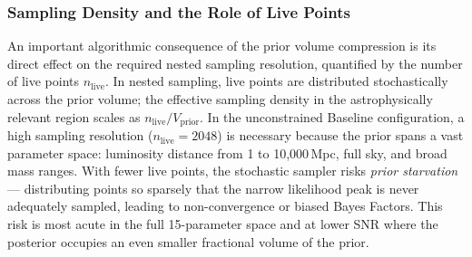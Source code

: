 \documentclass[12pt]{article}
\begin{document}
\subsubsection{Sampling Density and the Role of Live Points}
\label{sec:nlive_justification}
An important algorithmic consequence of the prior volume compression is its direct effect on the required nested sampling resolution, quantified by the number of live points $n_{\text{live}}$. In nested sampling, live points are distributed stochastically across the prior volume; the effective sampling density in the astrophysically relevant region scales as $n_{\text{live}} / V_{\text{prior}}$. In the unconstrained Baseline configuration, a high sampling resolution ($n_{\text{live}} = 2048$) is necessary because the prior spans a vast parameter space: luminosity distance from 1 to 10{,}000\,Mpc, full sky, and broad mass ranges. With fewer live points, the stochastic sampler risks \textit{prior starvation} — distributing points so sparsely that the narrow likelihood peak is never adequately sampled, leading to non-convergence or biased Bayes Factors. This risk is most acute in the full 15-parameter space and at lower SNR where the posterior occupies an even smaller fractional volume of the prior.
\end{document}
